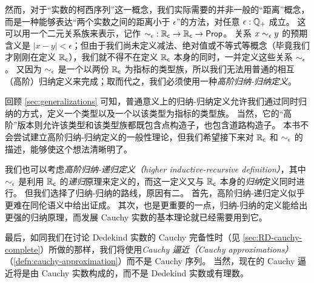 然而，对于``实数的柯西序列''这一概念，我们实际需要的并非一般的``距离''概念，而是一种能够表达``两个实数之间的距离小于 $\epsilon$''的方法，对任意 $\epsilon:\mathbb{Q}_{+}$ 成立。
这可以用一个二元关系族来表示，记作 $\mathord{\sim_{\epsilon}} : \mathbb{R}_\mathsf{c}\to\mathbb{R}_\mathsf{c}\to \mathsf{Prop}$。
关系 $x \sim_{\epsilon} y$ 的预期含义是 $|x - y| < \epsilon$；但由于我们尚未定义减法、绝对值或不等式等概念（毕竟我们才刚刚在定义 $\mathbb{R}_\mathsf{c}$），我们就不得不在定义 $\mathbb{R}_\mathsf{c}$ 本身的同时，一并定义这些关系 $\sim_{\epsilon}$。
又因为 $\sim_{\epsilon}$ 是一个以两份 $\mathbb{R}_\mathsf{c}$ 为指标的类型族，所以我们无法用普通的相互（高阶）归纳定义来完成；取而代之，我们必须使用一种\emph{高阶归纳-归纳定义}。

回顾 \cref{sec:generalizations} 可知，普通意义上的归纳-归纳定义允许我们通过同时归纳的方式，定义一个类型以及一个以该类型为指标的类型族。
当然，它的``高阶''版本则允许该类型和该类型族都既包含点构造子，也包含道路构造子。
本书不会尝试建立高阶归纳-归纳定义的一般性理论，但我们希望接下来对 $\mathbb{R}_\mathsf{c}$ 和 $\sim_{\epsilon}$ 的描述，能够使这个想法清晰明了。

\begin{rmk}
  我们也可以考虑\emph{高阶归纳-递归定义（higher inductive-recursive definition）}，其中 $\sim_{\epsilon}$ 是利用 $\mathbb{R}_\mathsf{c}$ 的\emph{递归}原理来定义的，而这一定义又与 $\mathbb{R}_\mathsf{c}$ 本身的\emph{归纳}定义同时进行。
  但我们选择了归纳-归纳的路线，原因有二。
  首先，高阶归纳-递归定义似乎更难在同伦语义中给出证成。
  其次，也是更重要的一点，归纳-归纳的定义能给出更强的归纳原理，而发展 Cauchy 实数的基本理论就已经需要用到它。
\end{rmk}

最后，如同我们在讨论 Dedekind 实数的 Cauchy 完备性时（见 \cref{sec:RD-cauchy-complete}）所做的那样，我们将使用\emph{Cauchy 逼近（Cauchy approximations）}（\cref{defn:cauchy-approximation}）而不是 Cauchy 序列。
当然，现在的 Cauchy 逼近将是由 Cauchy 实数构成的，而不是 Dedekind 实数或有理数。

